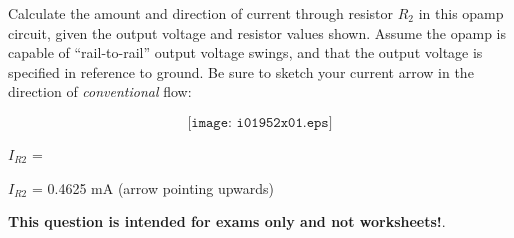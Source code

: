 

Calculate the amount and direction of current through resistor $R_2$ in this opamp circuit, given the output voltage and resistor values shown.  Assume the opamp is capable of ``rail-to-rail'' output voltage swings, and that the output voltage is specified in reference to ground.  Be sure to sketch your current arrow in the direction of {\it conventional} flow:

$$\texttt{[image: i01952x01.eps]}$$

$I_{R2}$ = 







$I_{R2}$ = 0.4625 mA (arrow pointing upwards)







{\bf This question is intended for exams only and not worksheets!}.


